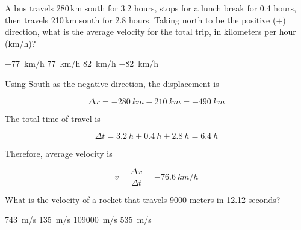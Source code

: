 \documentclass[]{exam}
\begin{document}
\begin{questions}

\question
A bus travels 280\,km south for 3.2 hours, stops for a lunch break for 0.4 hours, then travels 210\,km south for 2.8 hours. Taking north to be the positive ($+$) direction, what is the average velocity for the total trip, in kilometers per hour (km/h)?

\begin{randomizechoices}
    \correctchoice \SI{-77}{km/h}
    \choice \SI{77}{km/h}
    \choice \SI{82}{km/h}
    \choice \SI{-82}{km/h}
\end{randomizechoices}


\begin{solution}
    Using South as the negative direction, the displacement is
    
    \begin{equation*}
        \Delta x = -\SI{280}{km} - \SI{210}{km} = \SI{-490}{km}
    \end{equation*}

    The total time of travel is

    \begin{equation*}
        \Delta t = \SI{3.2}{h} + \SI{0.4}{h} + \SI{2.8}{h} = \SI{6.4}{h}
    \end{equation*}

    Therefore, average velocity is

    \begin{equation*}
        v = \frac{\Delta x}{\Delta t} = \boxed{\SI{-76.6}{km/h}}
    \end{equation*}
\end{solution}

\question
What is the velocity of a rocket that travels 9000 meters in 12.12 seconds?

\begin{randomizechoices}
    \correctchoice \SI{743}{m/s}
    \choice \SI{135}{m/s}
    \choice \SI{109000}{m/s}
    \choice \SI{535}{m/s}
\end{randomizechoices}


\end{questions}
\end{document}
